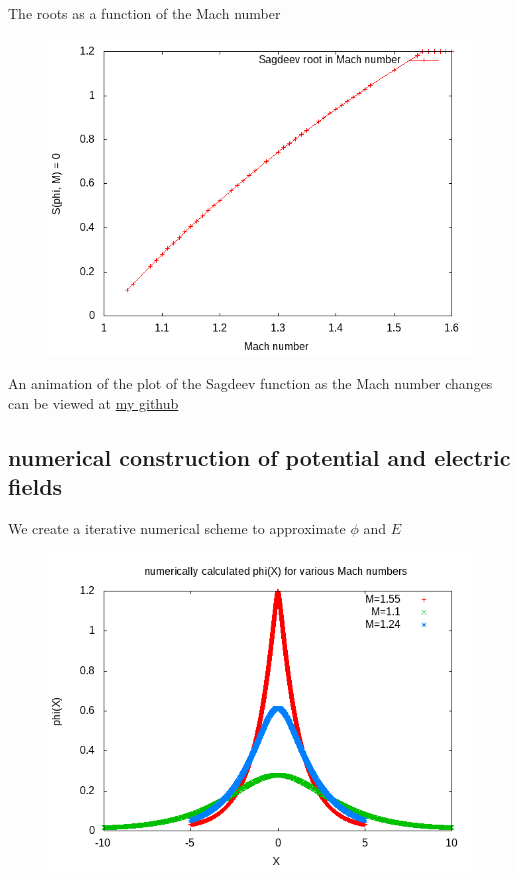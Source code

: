 \documentclass{report}
\begin{document}
The roots as a function of the Mach number
\begin{figure}
\includegraphics{sagdeevroots.png}
\end{figure}
An animation of the plot of the Sagdeev function as the Mach number changes can be viewed at 
\href{https://github.com/ramrunner/mhd-list/doc/anim.gif}{my github}

\subsection{numerical construction of potential and electric fields}
We create a iterative numerical scheme to approximate $\phi$ and $E$
\begin{figure}
\includegraphics{phiofxvarm.png}
\end{figure}
\end{document}
